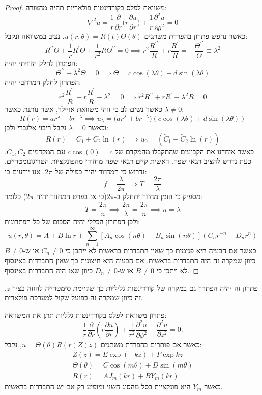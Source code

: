 \documentclass{tstextbook}
\begin{document}
\begin{proof}
משוואת לפלס בקורדינטות פולאריות תהיה מהצורה:
$$\nabla^{2}u={\frac{1}{r}}{\frac{\partial}{\partial r}}\Big(r{\frac{\partial u}{\partial r}}\Big)+{\frac{1}{r}}{\frac{\partial^{2}u}{\partial\theta^{2}}}=0$$
כאשר נחפש פתרון בהפרדת משתנים \(u\left( r,\theta \right)=R(t)\Theta\left( \theta \right)\). נציב במשוואה ונקבל:
$$R^{\prime\prime}\Theta+\frac{1}{r}R^{\prime}\Theta+\frac{1}{r^{2}}R\Theta^{\prime\prime}=0\implies r^{2}\frac{R^{\prime\prime}}{R}+r\frac{R^{\prime}}{R}=-\frac{\Theta^{\prime\prime}}{\Theta}\equiv\lambda^{2}$$
הפתרון לחלק הזוויתי יהיה:
$$\Theta^{\prime\prime}+\lambda^{2}\Theta=0\implies\Theta=c\cos\left( \lambda\theta \right)+d\sin\left( \lambda\theta \right)$$
הפתרון לחלק המרחבי יהיה:
$$r^{2}\frac{R^{\prime\prime}}{R}+r\frac{R^{\prime}}{R}-\lambda^{2}=0\implies r^{2}R^{\prime\prime}+r R^{\prime}-\lambda^{2}R=0$$
כאשר נשים לב כי זוהי משוואת אויילר, אשר נותנת כאשר \(\lambda \neq 0\):
$$R(r)=ar^{\lambda}+br^{-\lambda}\implies u_{\lambda}=\bigl(a r^{\lambda}+b r^{-\lambda}\bigr)(c\cos(\lambda\theta)+d\sin(\lambda\theta))$$
וכאשר \(\lambda=0\) נקבל ריבוי אלגברי ולכן:
$$R(r)=C_{1}+C_{2}\ln(r)\implies u_{0}=\left( \tilde{C}_{1}+\tilde{C}_{2}\ln(r) \right)$$
כאשר איחדנו את הקבועים שהתקבלו מהמקדם של \(c\cos(0)=c\) עם המקדמים \(C_{1},C_{2}\).
כעת נדרש להציב תנאי שפה. ראשית קיים תנאי שפה מחזורי מהפונקציות הטריגונומטריים, נדרוש כי המחזור יהיה כפולה של \(2\pi\). אנו יודעים כי:
$$f=\frac{\lambda}{2\pi}\implies T=\frac{2\pi}{\lambda}$$
מספיק כי הזמן מחזור יתחלק ב-\(2\pi\)(כי אז בפרט המחזור יהיה \(2\pi\)) כלומר:
$$T\overset{!}{=}  \frac{2\pi}{n}\implies \frac{2\pi}{\lambda}=\frac{2\pi}{n}\implies n=\lambda$$
ולכן הפתרון הכללי יהיה הסכום של כל הפתרונות:
$$\!\!\!u(r,\theta)\!=\!A\!+\!B\ln r\!+\!\sum_{n=1}^\infty\left[A_n\cos(n\theta)\!+\!B_n\sin(n\theta)\right](C_{n}r^{-n}\!+\!D_{n}r^n)$$
כאשר אם הבעיה היא פנימית כך שאין התבדרות בראשית לא ייתכן כי \(C_{n}\neq 0\) או ש-\(B\neq 0\) כיוון שמקרה זה היה התבדרות בראשית.
אם הבעיה היא חיצונית כך שאין התברדות באינסוף לא ייתכן כי \(B\neq 0\) או ש-\(D_{n}\neq 0\) כיוון שאז היה התבדרות באינסוף.

\end{proof}
\begin{remark}
פתרון זה יהיה הפתרון גם במקרה של קורדינטות גליליות כך שקיימת סימטרייה להזזה בציר \(z\). זה כיוון שמקרה זה בפועל שקול למערכת פולארית.

\end{remark}
\begin{proposition}
פתרון משוואת לפלס בקורדינטות גלליות תתן את המשוואה:
$$ \frac{1}{r }\frac{\partial}{\partial r}\left(r \frac{\partial u}{\partial r }\right)+\frac{1}{ r ^{2}}\frac{\partial^{2}u}{\partial\phi^{2}}+\frac{\partial^{2}u}{\partial z^{2}}=0.$$
כאשר אם פותרים בהפרדת משתנים \(u=\Theta\left( \theta \right)R(r)Z(z)\), נקבל:
\begin{gather*}  Z(z)=E\exp(-kz)+F\exp kz\\ \Theta\left( \theta \right)=C\cos \left( m\theta \right)+D\sin \left( m\theta \right) \\R(r)=AJ_m(kr)+BY_m(kr)
\end{gather*}
כאשר \(Y_{m}\) היא פונקציית בסל מהסוג השני ומופיע רק אם יש התבדרות בראשית.

\end{proposition}
\end{document}
